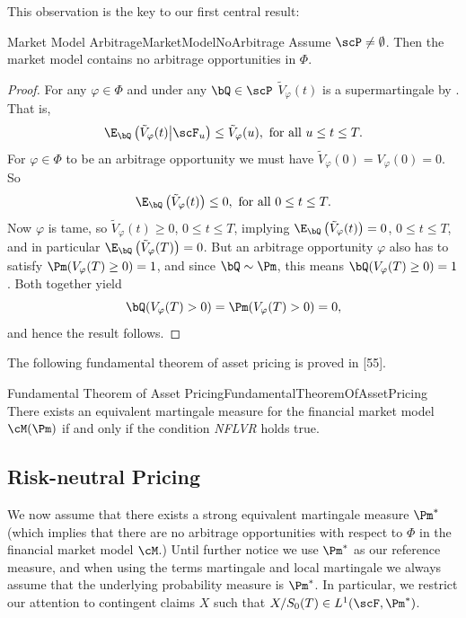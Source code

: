 This observation is the key to our first central result:

\begin{thm}{Market Model Arbitrage}{MarketModelNoArbitrage}
	Assume \(\scP \neq \emptyset\). Then the market model contains no arbitrage opportunities in \(\Phi\).
\end{thm}

\begin{proof}
	For any \(\varphi \in \Phi\) and under any \(\bQ \in \scP\) \(\tilde{V}_{\varphi}(t)\) is a supermartingale by . That is,
	\[
		\E_{\bQ}\left(\tilde{V}_{\varphi}(t) \middle| \scF_u\right) \le \tilde{V}_{\varphi}(u), \text{ for all } u \le t \le T.
	\]
	For \(\varphi \in \Phi\) to be an arbitrage opportunity we must have \(\tilde{V}_{\varphi}(0) = V_{\varphi}(0) = 0\). So
	\[
		\E_{\bQ}\left(\tilde{V}_{\varphi}(t)\right) \le 0, \text{ for all } 0 \le t \le T.
	\]
	Now \(\varphi\) is tame, so \(\tilde{V}_{\varphi}(t) \ge 0\), \(0 \le t \le T\), implying \(\E_{\bQ}\left(\tilde{V}_{\varphi}(t)\right) = 0\), \(0 \le t \le T\), and in particular \(\E_{\bQ}\left(\tilde{V}_{\varphi}(T)\right) = 0\). But an arbitrage opportunity \(\varphi\) also has to satisfy \(\Pm(V_{\varphi}(T) \ge 0) = 1\), and since \(\bQ \sim \Pm\), this means \(\bQ(V_{\varphi}(T) \ge 0) = 1\). Both together yield
	\[
		\bQ(V_{\varphi}(T) > 0) = \Pm(V_{\varphi}(T) > 0) = 0,
	\]
	and hence the result follows.
\end{proof}

The following fundamental theorem of asset pricing is proved in [55].

\begin{thm}{Fundamental Theorem of Asset Pricing}{FundamentalTheoremOfAssetPricing}
	There exists an equivalent martingale measure for the financial market model \(\cM(\Pm)\) if and only if the condition \textit{NFLVR} holds true.
\end{thm}

\subsection{Risk-neutral Pricing}

We now assume that there exists a strong equivalent martingale measure \(\Pm^*\) (which implies that there are no arbitrage opportunities with respect to \(\Phi\) in the financial market model \(\cM\).) Until further notice we use \(\Pm^*\) as our reference measure, and when using the terms martingale and local martingale we always assume that the underlying probability measure is \(\Pm^*\). In particular, we restrict our attention to contingent claims \(X\) such that \(X/S_0(T) \in L^1(\scF, \Pm^*)\).

